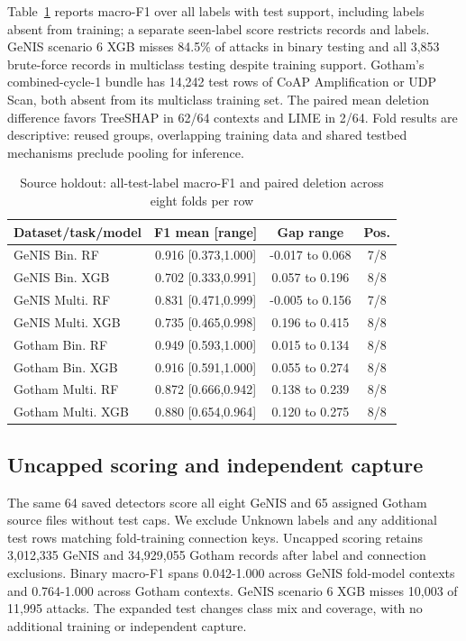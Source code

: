 \documentclass[conference,letterpaper]{IEEEtran}
\begin{document}
Table~\ref{tab:transfer} reports macro-F1 over all labels with test support, including labels absent from training; a separate seen-label score restricts records and labels. GeNIS scenario 6 XGB misses 84.5\% of attacks in binary testing and all 3,853 brute-force records in multiclass testing despite training support. Gotham's combined-cycle-1 bundle has 14,242 test rows of CoAP Amplification or UDP Scan, both absent from its multiclass training set. The paired mean deletion difference favors TreeSHAP in 62/64 contexts and LIME in 2/64. Fold results are descriptive: reused groups, overlapping training data and shared testbed mechanisms preclude pooling for inference.
\begin{table}[t]\centering
\caption{Source holdout: all-test-label macro-F1 and paired deletion across eight folds per row}
\label{tab:transfer}
\footnotesize
\setlength{\tabcolsep}{3pt}\renewcommand{\arraystretch}{1.12}
\begin{tabular}{lccc}\toprule
Dataset/task/model & F1 mean [range] & Gap range & Pos. \\\midrule
GeNIS Bin. RF & 0.916 [0.373,1.000] & -0.017 to 0.068 & 7/8 \\
GeNIS Bin. XGB & 0.702 [0.333,0.991] & 0.057 to 0.196 & 8/8 \\
GeNIS Multi. RF & 0.831 [0.471,0.999] & -0.005 to 0.156 & 7/8 \\
GeNIS Multi. XGB & 0.735 [0.465,0.998] & 0.196 to 0.415 & 8/8 \\
Gotham Bin. RF & 0.949 [0.593,1.000] & 0.015 to 0.134 & 8/8 \\
Gotham Bin. XGB & 0.916 [0.591,1.000] & 0.055 to 0.274 & 8/8 \\
Gotham Multi. RF & 0.872 [0.666,0.942] & 0.138 to 0.239 & 8/8 \\
Gotham Multi. XGB & 0.880 [0.654,0.964] & 0.120 to 0.275 & 8/8 \\
\bottomrule\end{tabular}
\end{table}

\subsection{Uncapped scoring and independent capture}
The same 64 saved detectors score all eight GeNIS and 65 assigned Gotham source files without test caps. We exclude Unknown labels and any additional test rows matching fold-training connection keys. Uncapped scoring retains 3,012,335 GeNIS and 34,929,055 Gotham records after label and connection exclusions. Binary macro-F1 spans 0.042-1.000 across GeNIS fold-model contexts and 0.764-1.000 across Gotham contexts. GeNIS scenario 6 XGB misses 10,003 of 11,995 attacks. The expanded test changes class mix and coverage, with no additional training or independent capture.
\end{document}
